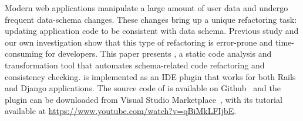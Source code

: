 Modern web applications manipulate a large amount of user data and undergo frequent data-schema changes. These changes bring up a unique refactoring 
task: updating application code to be consistent with data schema. Previous
 study and our own investigation show that this type of refactoring is 
error-prone and time-consuming for developers.
This paper presents \Tool, a static code analysis and transformation tool that
automates schema-related code refactoring and consistency checking. 
\Tool is implemented as an IDE 
plugin that works for both Rails and Django applications. 
The source code of \Tool is available on Github~\cite{sourcecode} and the plugin can be downloaded from Visual Studio Marketplace~\cite{vscodemarketplace}, with its tutorial available at \url{https://www.youtube.com/watch?v=qBiMkLFIjbE}. 